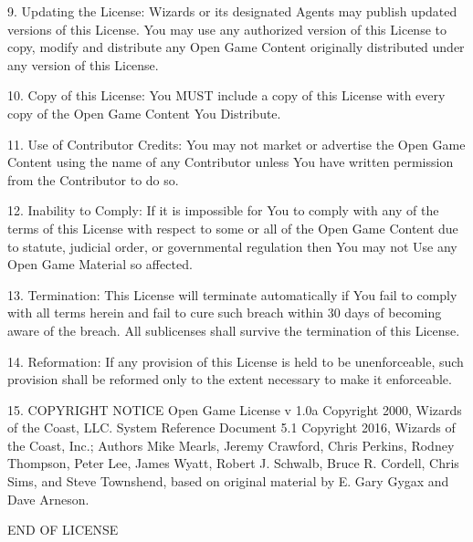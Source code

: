9. Updating the License: Wizards or its designated 
Agents may publish updated versions of this License. 
You may use any authorized version of this License 
to copy, modify and distribute any Open Game 
Content originally distributed under any version of 
this License. 

10. Copy of this License: You MUST include a copy of 
this License with every copy of the Open Game 
Content You Distribute. 

11. Use of Contributor Credits: You may not market 
or advertise the Open Game Content using the name 
of any Contributor unless You have written 
permission from the Contributor to do so. 

12. Inability to Comply: If it is impossible for You to 
comply with any of the terms of this License with 
respect to some or all of the Open Game Content due 
to statute, judicial order, or governmental regulation 
then You may not Use any Open Game Material so 
affected. 

13. Termination: This License will terminate 
automatically if You fail to comply with all terms 
herein and fail to cure such breach within 30 days of 
becoming aware of the breach. All sublicenses shall 
survive the termination of this License. 

14. Reformation: If any provision of this License is 
held to be unenforceable, such provision shall be 
reformed only to the extent necessary to make it 
enforceable. 

15. COPYRIGHT NOTICE 
Open Game License v 1.0a Copyright 2000, Wizards 
of the Coast, LLC. 
System Reference Document 5.1 Copyright 2016, 
Wizards of the Coast, Inc.; Authors Mike Mearls, 
Jeremy Crawford, Chris Perkins, Rodney Thompson, 
Peter Lee, James Wyatt, Robert J. Schwalb, Bruce R. 
Cordell, Chris Sims, and Steve Townshend, based on 
original material by E. Gary Gygax and Dave Arneson. 

END OF LICENSE 
